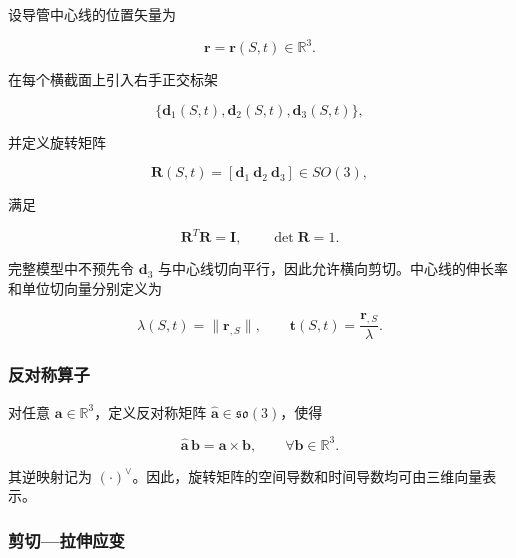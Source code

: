 设导管中心线的位置矢量为

\begin{equation}
\label{eq:rod-1-2}
\mathbf{r} = \mathbf{r}(S,t) \in \mathbb{R}^{3}.
\end{equation}

在每个横截面上引入右手正交标架

\begin{equation}
\label{eq:rod-1-3}
\{\mathbf{d}_{1}(S,t),\mathbf{d}_{2}(S,t),\mathbf{d}_{3}(S,t)\},
\end{equation}

并定义旋转矩阵

\begin{equation}
\label{eq:rod-1-4}
\mathbf{R}(S,t) = \left\lbrack \mathbf{d}_{1}\ \mathbf{d}_{2}\ \mathbf{d}_{3} \right\rbrack \in SO(3),
\end{equation}

满足

\begin{equation}
\label{eq:rod-1-5}
\mathbf{R}^{T}\mathbf{R} = \mathbf{I},\quad\quad\det\mathbf{R} = 1.
\end{equation}

完整模型中不预先令 \(\mathbf{d}_{3}\) 与中心线切向平行，因此允许横向剪切。中心线的伸长率和单位切向量分别定义为

\begin{equation}
\label{eq:rod-1-6}
\lambda(S,t) = \parallel \mathbf{r}_{,S} \parallel ,\quad\quad\mathbf{t}(S,t) = \frac{\mathbf{r}_{,S}}{\lambda}.
\end{equation}

\subsubsection{反对称算子}\label{sec:rod-1-2-2}

对任意 \(\mathbf{a} \in \mathbb{R}^{3}\)，定义反对称矩阵 \(\widehat{\mathbf{a}} \in \mathfrak{so}(3)\)，使得\cite{Sola2018MicroLie,MarsdenRatiu1999MechanicsSymmetry}

\begin{equation}
\label{eq:rod-1-7}
\widehat{\mathbf{a}}\,\mathbf{b} = \mathbf{a} \times \mathbf{b},\quad\quad\forall\mathbf{b} \in \mathbb{R}^{3}.
\end{equation}

其逆映射记为 \(( \cdot )^{\vee}\)。因此，旋转矩阵的空间导数和时间导数均可由三维向量表示。

\subsubsection{剪切---拉伸应变}\label{sec:rod-1-2-3}

